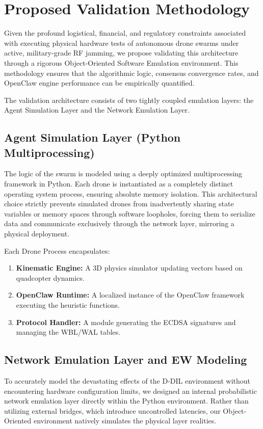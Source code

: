 \section{Proposed Validation Methodology}

Given the profound logistical, financial, and regulatory constraints associated with executing physical hardware tests of autonomous drone swarms under active, military-grade RF jamming, we propose validating this architecture through a rigorous Object-Oriented Software Emulation environment. This methodology ensures that the algorithmic logic, consensus convergence rates, and OpenClaw engine performance can be empirically quantified.

The validation architecture consists of two tightly coupled emulation layers: the Agent Simulation Layer and the Network Emulation Layer.

\subsection{Agent Simulation Layer (Python Multiprocessing)}
The logic of the swarm is modeled using a deeply optimized multiprocessing framework in Python. Each drone is instantiated as a completely distinct operating system process, ensuring absolute memory isolation. This architectural choice strictly prevents simulated drones from inadvertently sharing state variables or memory spaces through software loopholes, forcing them to serialize data and communicate exclusively through the network layer, mirroring a physical deployment.

Each Drone Process encapsulates:
\begin{enumerate}
    \item \textbf{Kinematic Engine:} A 3D physics simulator updating vectors based on quadcopter dynamics.
    \item \textbf{OpenClaw Runtime:} A localized instance of the OpenClaw framework executing the heuristic functions.
    \item \textbf{Protocol Handler:} A module generating the ECDSA signatures and managing the WBL/WAL tables.
\end{enumerate}

\subsection{Network Emulation Layer and EW Modeling}
To accurately model the devastating effects of the D-DIL environment without encountering hardware configuration limits, we designed an internal probabilistic network emulation layer directly within the Python environment. Rather than utilizing external bridges, which introduce uncontrolled latencies, our Object-Oriented environment natively simulates the physical layer realities.

